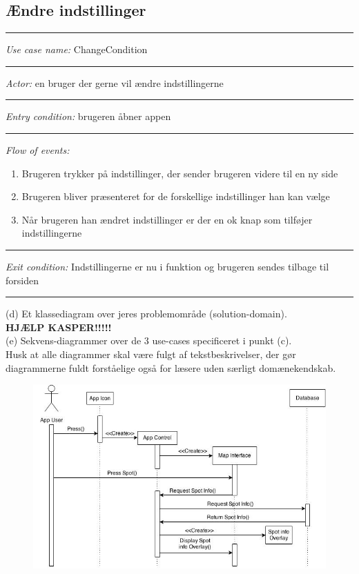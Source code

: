 \documentclass[12pt]{article}
\begin{document}
\subsection*{Ændre indstillinger}
\hrule\vspace{5mm}
\textit{Use case name:} ChangeCondition\\
\hrule\vspace{5mm}
\textit{Actor:} en bruger der gerne vil ændre indstillingerne\\
\hrule\vspace{5mm}
\textit{Entry condition:} brugeren åbner appen\\
\hrule\vspace{5mm}
\textit{Flow of events:}
\begin{enumerate}
\item Brugeren trykker på indstillinger, der sender brugeren videre til en ny side
\item Brugeren bliver præsenteret for de forskellige indstillinger han kan vælge
\item Når brugeren han ændret indstillinger er der en ok knap som tilføjer indstillingerne
\end{enumerate}
\hrule\vspace{5mm}
\textit{Exit condition:} Indstillingerne er nu i funktion og brugeren sendes tilbage til forsiden\\
\hrule\vspace{5mm}
\pagebreak

(d) Et klassediagram over jeres problemområde (solution-domain).\\
\textbf{HJÆLP KASPER!!!!!}\\
(e) Sekvens-diagrammer over de 3 use-cases specificeret i punkt (c).\\
Husk at alle diagrammer skal være fulgt af tekstbeskrivelser, der gør diagrammerne fuldt
forståelige også for læsere uden særligt domænekendskab.\\
\begin{figure}[h]
\includegraphics[scale = 0.5]{sekdia1}
\end{figure}
\end{document}
